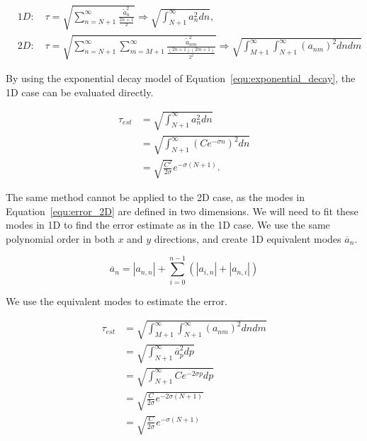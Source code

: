\begin{align}
	&1D: \quad \tau = \sqrt{\sum_{n = N + 1}^{\infty } \frac{\widetilde{a}_n^2}{\frac{2n + 1}{2}}} 
			   \Rightarrow \sqrt{\int_{N + 1}^{\infty } a_n^2 dn}, \label{equ:error_1D}
	\\
	&2D: \quad \tau = \sqrt{\sum_{n = N + 1}^{\infty }\sum_{m = M + 1}^{\infty}\frac{\widetilde{a}^2_{nm}}{\frac{(2n + 1)(2m + 1)}{2^2}}}
			   \Rightarrow \sqrt{\int_{M+1}^{\infty }\int_{N + 1 }^{\infty}{(a_{nm})}^2 dn dm} \label{equ:error_2D}
\end{align}

\noindent
By using the exponential decay model of Equation~\ref{equ:exponential_decay}, the 1D case can be
evaluated directly.

\begin{equation}
	\begin{aligned}
		\tau_{est} &= \sqrt{\int_{N + 1}^{\infty } a_n^2 dn} \\
		&= \sqrt{\int_{N + 1}^{\infty } {\left( Ce^{-\sigma n} \right)}^2 dn} \\
		&= \sqrt{\frac{C^2}{2\sigma }}e^{-\sigma (N + 1)}. 
	\end{aligned}
\end{equation}

The same method cannot be applied to the 2D case, as the modes in Equation~\ref{equ:error_2D} are
defined in two dimensions. We will need to fit these modes in 1D to find the error estimate as in
the 1D case. We use the same polynomial order in both \(x\) and \(y\) directions, and create 1D
equivalent modes \(\overline{a}_n\). 

\begin{equation}
	\overline{a}_n = \left| a_{n,n} \right| + \sum_{i = 0}^{n-1} \left( \left| a_{i, n} \right| + \left| a_{n, i} \right| \right)
\end{equation}

\noindent
We use the equivalent modes to estimate the error.

\begin{equation}
	\begin{aligned}
		\tau_{est} &= \sqrt{\int_{M+1}^{\infty }\int_{N + 1 }^{\infty}{(a_{nm})}^2 dn dm} \\
		&= \sqrt{\int_{N + 1}^{\infty }\overline{a}_p^2 dp} \\
		&= \sqrt{\int_{N + 1}^{\infty} Ce^{-2\sigma p}dp} \\
		&= \sqrt{\frac{C}{2\sigma}e^{-2\sigma(N + 1)}} \\
		&= \sqrt{\frac{C}{2\sigma}} e^{-\sigma (N + 1)}
	\end{aligned}
\end{equation}

